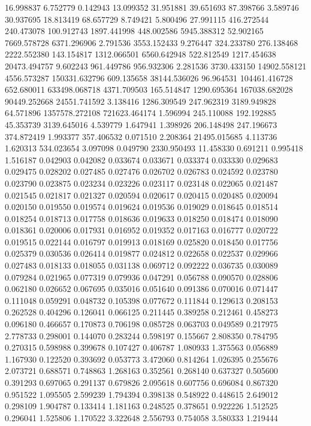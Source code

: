 16.998837
6.752779
0.142943
13.099352
31.951881
39.651693
87.398766
3.589746
30.937695
18.813419
68.657729
8.749421
5.800496
27.991115
416.272544
240.473078
100.912743
1897.441998
448.002586
5945.388312
52.902165
7669.578728
6371.296906
2.791536
3553.152433
9.276447
324.233780
276.138468
2222.552380
143.154817
1312.066501
6560.642948
522.812549
1217.454638
20473.494757
9.602243
961.449786
956.932306
2.281536
3730.433150
14902.558121
4556.573287
150331.632796
609.135658
38144.536026
96.964531
104461.416728
652.680011
633498.068718
4371.709503
165.514847
1290.695364
167038.682028
90449.252668
24551.741592
3.138416
1286.309549
247.962319
3189.949828
64.571896
1357578.272108
721623.464174
1.596994
245.110088
192.192885
45.353739
3139.645016
4.539779
1.647941
1.398926
206.148498
247.196673
374.872419
1.993377
357.406532
0.071510
2.208364
21495.015685
4.113736
1.620313
534.023654
3.097098
0.049790
2330.950493
11.458330
0.691211
0.995418
1.516187
0.042903
0.042082
0.033674
0.033671
0.033374
0.033330
0.029683
0.029475
0.028202
0.027485
0.027476
0.026702
0.026783
0.024592
0.023780
0.023790
0.023875
0.023234
0.023226
0.023117
0.023148
0.022065
0.021487
0.021545
0.021817
0.021327
0.020594
0.020617
0.020415
0.020485
0.020094
0.020150
0.019550
0.019574
0.019624
0.019536
0.019029
0.018645
0.018514
0.018254
0.018713
0.017758
0.018636
0.019633
0.018250
0.018474
0.018090
0.018361
0.020006
0.017931
0.016952
0.019352
0.017163
0.016777
0.020722
0.019515
0.022144
0.016797
0.019913
0.018169
0.025820
0.018450
0.017756
0.025379
0.030536
0.026414
0.019877
0.024812
0.022658
0.022537
0.029966
0.027483
0.018133
0.018055
0.031138
0.069712
0.092222
0.036735
0.030089
0.079284
0.021965
0.077319
0.079936
0.047291
0.056788
0.090570
0.028806
0.062180
0.026652
0.067695
0.035016
0.051640
0.091386
0.070016
0.071447
0.111048
0.059291
0.048732
0.105398
0.077672
0.111844
0.129613
0.208153
0.262528
0.404296
0.126041
0.066125
0.211445
0.389258
0.212461
0.458273
0.096180
0.466657
0.170873
0.706198
0.085728
0.063703
0.049589
0.217975
2.778733
0.298001
0.144070
0.283244
0.598197
0.155667
2.808350
0.784795
0.270315
0.598988
0.399678
0.107427
0.406787
1.080933
1.375563
0.056889
1.167930
0.122520
0.393692
0.053773
3.472060
0.814264
1.026395
0.255676
2.073721
0.688571
0.748863
1.268163
0.352561
0.268140
0.637327
0.505600
0.391293
0.697065
0.291137
0.679826
2.095618
0.607756
0.696084
0.867320
0.951522
1.095505
2.599239
1.794394
0.398138
0.548922
0.448615
2.649012
0.298109
1.904787
0.133414
1.181163
0.248525
0.378651
0.922226
1.512525
0.296041
1.525806
1.170522
3.322648
2.556793
0.754058
3.580333
1.219444
